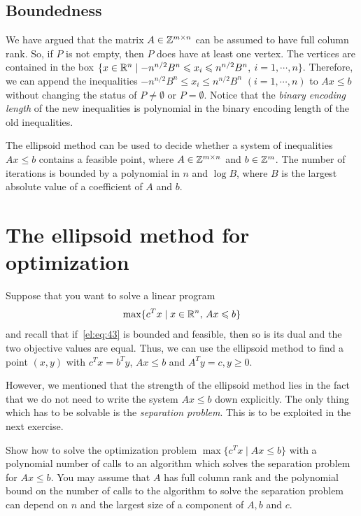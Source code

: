 \subsection{Boundedness}
\label{el:sec:boundedness}

We have argued that the matrix $A \in \mathbb{Z}^{m\times n}$ can be assumed to have
full column rank. So, if $P$ is not empty, then $P$ does have at least
one vertex. The vertices are contained in the box $\{x \in \mathbb{R}^n \mid
-n^{n/2} B^n \leqslant x_i \leqslant n^{n/2} B^n,$ $i=1,\cdots,n\}$. Therefore, we can append the
inequalities $-n^{n/2} B^n \leq x_i \leq n^{n/2} B^n$ 
$(i=1,\cdots,n)$ to $Ax\leq b$ without
changing the status of $P \neq \emptyset$ or $P = \emptyset$. Notice that the
\emph{binary encoding length} of the new inequalities is polynomial in
the binary encoding length of the old inequalities.



\begin{theorem}
  \label{el:thr:25}
  The ellipsoid method can be used to decide whether a system of
  inequalities $Ax\leq b$ contains a feasible point, where $A\in\mathbb{Z}^{m\times n}$
  and $b\in \mathbb{Z}^m$. The number of iterations is bounded by a polynomial
  in $n$ and $\log B$, where $B$ is the largest absolute value of a
  coefficient of $A$ and $b$.
\end{theorem}

\section{The ellipsoid method for optimization}
\label{el:sec:ellips-meth-optim}

Suppose that you want to solve a linear program 
\begin{equation}
  \label{el:eq:43}
  \max \{ c^Tx \mid x \in \mathbb{R}^n, \, Ax\leqslant b\} 
\end{equation}
and recall that if~\eqref{el:eq:43} is bounded and feasible, then so is
its dual and the two objective values are equal. Thus, we can use the
ellipsoid method to find a point $(x,y)$  with $c^Tx = b^Ty$, $Ax\leq b$
and $A^Ty=c, y\geq0$. 


However, we mentioned that the strength of the ellipsoid method lies
in the fact that we do not need to write the system $Ax\leq b$ down
explicitly. The only thing which has to be solvable is the
\emph{separation problem}. This is to be exploited in the next
exercise. 


\begin{exercise}
  \label{el:ex:12}
  Show how to solve the optimization problem $\max\{c^Tx \mid Ax\leq b\}$
  with a polynomial number of calls to an algorithm which solves the
  separation problem for $Ax\leq b$. You may assume that $A$ has full
  column rank and the polynomial bound on the number of calls to the
  algorithm to    solve the separation problem can depend on $n$ and
  the largest size of a component of $A,b$ and $c$. 
\end{exercise}


